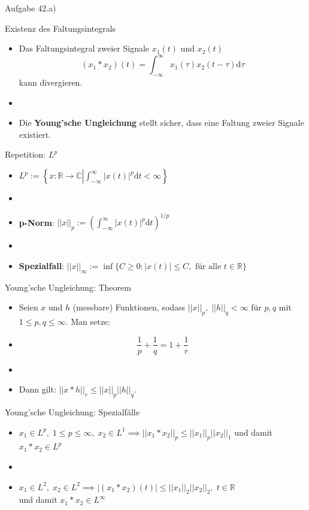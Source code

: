 \documentclass[14pt, aspectratio=169, handout]{beamer}
\begin{document}
\begin{frame}{Aufgabe 42.a)}
    
\end{frame}

\begin{frame}{Existenz des Faltungsintegrals}
    \begin{itemize}
        \item Das Faltungsintegral zweier Signale $x_1(t)$ und $x_2(t)$ $$(x_1 \ast x_2)(t) = \int_{-\infty}^{\infty} x_1(\tau)x_2(t-\tau) \text{d}\tau$$ kann divergieren.
        \item[] 
        \item Die \textbf{Young'sche Ungleichung} stellt sicher, dass eine Faltung zweier Signale existiert.
    \end{itemize}
\end{frame}

\begin{frame}{Repetition: $L^p$}
    \begin{itemize}
        \item $L^p := \left\{ x:\mathbb{R} \to \mathbb{C} \left| \displaystyle\int_{-\infty}^{\infty} |x(t)|^p \text{d}t < \infty \right. \right\}$
        \item[] 
        \item \textbf{p-Norm}: $||x||_p := \left(\displaystyle\int_{-\infty}^{\infty} |x(t)|^p \text{d}t\right)^{1/p}$
        \item[] 
        \item \textbf{Spezialfall}: $||x||_{\infty} := \inf\{C \geq 0: |x(t)| \leq C, \text{ für alle } t\in \mathbb{R}\}$
    \end{itemize}
\end{frame}

\begin{frame}{Young'sche Ungleichung: Theorem}
    \begin{itemize} 
        \item Seien $x$ und $h$ (messbare) Funktionen, sodass $||x||_p, \; ||h||_q < \infty$ für $p,q$ mit $1 \leq p,q \leq \infty$. Man setze:
        \item[] 
        $$\frac{1}{p} + \frac{1}{q} = 1 + \frac{1}{r}$$
        \item[] 
        \item[] Dann gilt: $||x \ast h||_r \leq ||x||_p||h||_q$.
    \end{itemize}
\end{frame}

\begin{frame}{Young'sche Ungleichung: Spezialfälle}
    \begin{itemize}
        \item $x_1 \in L^p, \; 1 \leq p \leq \infty, \; x_2 \in L^1 \implies ||x_1 \ast x_2 ||_p \leq ||x_1||_p ||x_2||_1$ und damit $x_1 \ast x_2 \in L^p$
        \item[] 
        \item $x_1 \in L^2, \; x_2 \in L^2 \implies |(x_1 \ast x_2 )(t)| \leq ||x_1||_2 ||x_2||_2, \; t \in \mathbb{R}$ \\und damit $x_1 \ast x_2 \in L^\infty$
    \end{itemize}
\end{frame}
\end{document}
